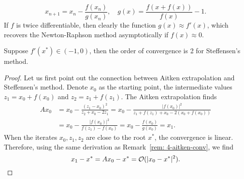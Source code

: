 \begin{equation*}
       x_{n+1} = x_n - \frac{f(x_n)}{g(x_n)} ,\quad 
g(x)= \frac{f(x + f(x))}{f(x)} - 1.
\end{equation*}
If $f$ is twice differentiable, then clearly the function $g(x)\approx f'(x)$, which recovers the Newton-Raphson method asymptotically if $f(x)\approx 0$.
\begin{theorem}
    Suppose $f'(x^{\ast})\in (-1, 0)$, then the order of convergence is 2 for Steffensen's method.
\end{theorem}
\begin{proof}
    Let us first point out the connection between Aitken extrapolation and Steffensen's method. Denote $x_0$ as the starting point, the intermediate values $z_1 = x_0 +f (x_0)$ and $z_2 =z_1 +f(z_1)$. The Aitken extrapolation finds
    \begin{equation}
    \begin{aligned}
    A x_0 &= x_0 - \frac{(z_1 - x_0)^2}{z_2 + x_0 - 2 z_1 } = x_0 - \frac{|f(x_0)|^2}{z_1 + f(z_1) + x_0 - 2 (x_0 + f(x_0)) }     \\
    &=x_0 - \frac{|f(x_0)|^2}{f(z_1) - f(x_0)} = x_0 - \frac{f(x_0)}{g(x_0)} = x_1.
    \end{aligned}
    \end{equation}
    When the iterates $x_0, z_1, z_2$ are close to the root $x^{\ast}$, the convergence is linear. Therefore, using the same derivation as Remark~\ref{rem: 4-aitken-conv}, we find 
    \begin{equation*}
       x_1 - x^{\ast} = A x_0 - x^{\ast} = \mathcal O( | x_0 - x^{\ast}|^2 ).
    \end{equation*}
\end{proof}

